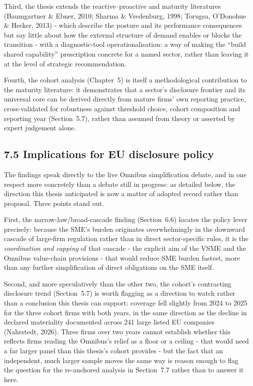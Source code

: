 \documentclass[
]{article}
\begin{document}
Third, the thesis extends the reactive--proactive and maturity literatures
(Baumgartner \& Ebner, 2010; Sharma \& Vredenburg, 1998; Torugsa, O'Donohue \&
Hecker, 2013) - which describe the posture and its performance consequences
but say little about how the external structure of demand enables or blocks
the transition - with a diagnostic-tool operationalisation: a way of making
the ``build shared capability'' prescription concrete for a named sector,
rather than leaving it at the level of strategic recommendation.

Fourth, the cohort analysis (Chapter~5) is itself a methodological
contribution to the maturity literature: it demonstrates that a sector's
disclosure frontier and its universal core can be derived directly from
mature firms' own reporting practice, cross-validated for robustness against
threshold choice, cohort composition and reporting year (Section~5.7), rather
than assumed from theory or asserted by expert judgement alone.

\subsection{7.5 Implications for EU disclosure
policy}\label{discussion-policy}

The findings speak directly to the live Omnibus simplification debate, and
in one respect more concretely than a debate still in progress: as detailed
below, the direction this thesis anticipated is now a matter of adopted
record rather than proposal. Three points stand out.

First, the narrow-law/broad-cascade finding (Section~6.6)
locates the policy lever precisely: because the SME's burden originates
overwhelmingly in the downward cascade of large-firm regulation rather than in
direct sector-specific rules, it is the \emph{coordination and capping} of
that cascade - the explicit aim of the VSME and the Omnibus value-chain
provisions - that would reduce SME burden fastest, more than any further
simplification of direct obligations on the SME itself.

Second, and more speculatively than the other two, the cohort's contracting
disclosure trend (Section~5.7) is worth flagging as a
direction to watch rather than a conclusion this thesis can support: coverage
fell slightly from 2024 to 2025 for the three cohort firms with both years,
in the same direction as the decline in declared materiality documented
across 241 large listed EU companies (Nahrstedt, 2026). Three firms over two years cannot establish whether
this reflects firms reading the Omnibus's relief as a floor or a ceiling - that would need a far larger panel than this thesis's cohort provides - but
the fact that an independent, much larger sample moves the same way is reason
enough to flag the question for the re-anchored analysis in Section~7.7
rather than to answer it here.
\end{document}

